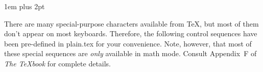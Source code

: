 {
%
%
%

\def\ctr#1{\hss#1\hss}
\def\\{\char `\\}
\def\v{\vrule height 20pt depth 10pt width 0pt}
\tabskip 1em
\parskip 6pt plus 2pt
\abovedisplayskip 0pt
\belowdisplayskip 0pt
\def\dcolumn#1{$\vcenter
               {
                \halign{\v$\ctr{##}$&$\displaystyle\ctr{##}$&{\tt ##}\cr#1}
               }$
             }
\def\column#1{$\vcenter
               {
                \halign{$\ctr{##}$&{\tt ##}\cr#1}
               }$
             }
\def\sect#1{\penalty-1000
            \vskip 12pt plus 6pt
            {\sl #1}
            \vskip 4pt
            \penalty9999\ignorespaces}

There are many special-purpose characters available from \TeX, but most of
them don't appear on most keyboards.  Therefore, the following control
sequences have been pre-defined in plain.tex for your convenience.
Note, however, that most of these special sequences are {\sl only\/}
available in math mode.  Consult Appendix~F of {\sl The \TeX book\/}
for complete details.

}
